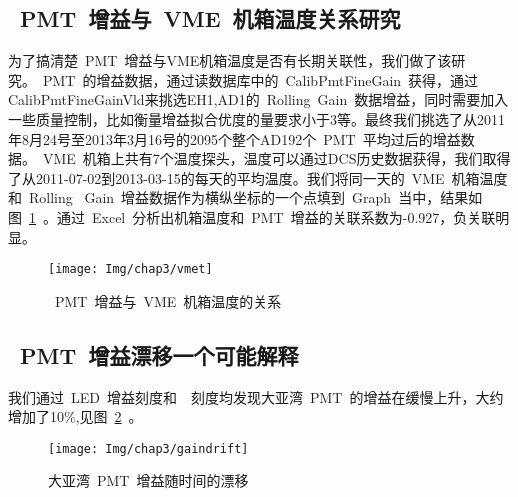 \subsection{~PMT~增益与~VME~机箱温度关系研究}
为了搞清楚~PMT~增益与VME机箱温度是否有长期关联性，我们做了该研究。~PMT~的增益数据，通过读数据库中的~CalibPmtFineGain~获得，通过CalibPmtFineGainVld来挑选EH1,AD1的~Rolling~Gain~数据增益，同时需要加入一些质量控制，比如衡量增益拟合优度的量要求小于3等。最终我们挑选了从2011年8月24号至2013年3月16号的2095个整个AD192个~PMT~平均过后的增益数据。~VME~机箱上共有7个温度探头，温度可以通过DCS历史数据获得，我们取得了从2011-07-02到2013-03-15的每天的平均温度。我们将同一天的~VME~机箱温度和~Rolling~ Gain~增益数据作为横纵坐标的一个点填到~Graph~当中，结果如图~\ref{fig:vmeT}~。通过~Excel~分析出机箱温度和~PMT~增益的关联系数为-0.927，负关联明显。

\begin{figure}[!htbp]
  \centering
   \texttt{[image: Img/chap3/vmet]}
    \caption{~PMT~增益与~VME~机箱温度的关系}
  \label{fig:vmeT}
\end{figure}


\subsection{~PMT~增益漂移一个可能解释}
我们通过~LED~增益刻度和~~刻度均发现大亚湾~PMT~的增益在缓慢上升，大约增加了10\%,见图~\ref{fig:gaindrift}~。
\begin{figure}[!htbp]
  \centering
   \texttt{[image: Img/chap3/gaindrift]}
    \caption{ 大亚湾~PMT~增益随时间的漂移}
  \label{fig:gaindrift}
\end{figure}




